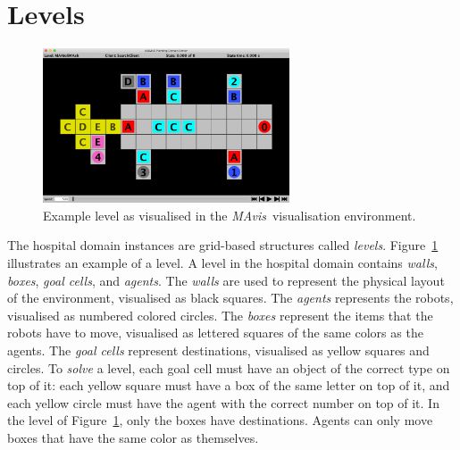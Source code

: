 \documentclass[12pt,a4paper]{article}
\def\mavis{{\itshape MAvis}}
\begin{document}
\section{Levels}\label{sec:env_description}
\begin{figure}
  \begin{center}
    \includegraphics[width=0.65\textwidth]{MAAIoliMAsh}
  \end{center}
  \caption{Example level as visualised in the \mavis\ visualisation environment. }\label{figu:aioli}
\end{figure}
The hospital domain instances are grid-based structures called \emph{levels}. Figure~\ref{figu:aioli} illustrates an example of a level. A level in the hospital domain contains \emph{walls}, \emph{boxes}, \emph{goal cells}, and \emph{agents}. The \emph{walls} are used to represent the physical layout of the environment, visualised as black squares. The \emph{agents} represents the robots, visualised as numbered colored circles. The \emph{boxes} represent the items that the robots have to move, visualised as lettered squares of the same colors as the agents. The \emph{goal cells} represent destinations, visualised as yellow squares and circles. To \emph{solve} a level, each goal cell must have an object of the correct type on top of it: each yellow square must have a box of the same letter on top of it, and each yellow circle must have the agent with the correct number on top of it. In the level of Figure~\ref{figu:aioli}, only the boxes have destinations.  Agents can only move boxes that have the same color as themselves.  
\end{document}
